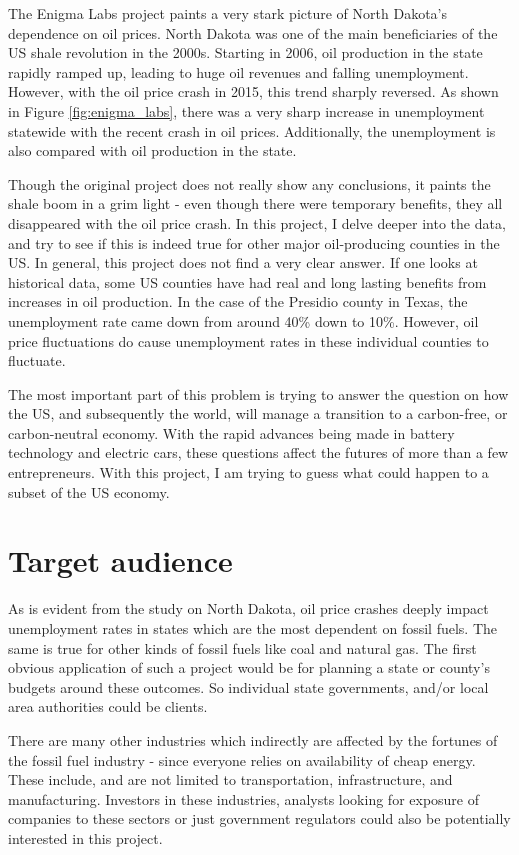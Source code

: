 \documentclass[11pt,letterpaper]{article}
\begin{document}
The Enigma Labs project paints a very stark picture of North Dakota's dependence on oil prices. North Dakota was one of the main beneficiaries of the US shale revolution in the 2000s. Starting in 2006, oil production in the state rapidly ramped up, leading to huge oil revenues and falling unemployment. However, with the oil price crash in 2015, this trend sharply reversed. As shown in Figure \ref{fig:enigma_labs}, there was a very sharp increase in unemployment statewide with the recent crash in oil prices. Additionally, the unemployment is also compared with oil production in the state. 

Though the original project does not really show any conclusions, it paints the shale boom in a grim light - even though there were temporary benefits, they all disappeared with the oil price crash. In this project, I delve deeper into the data, and try to see if this is indeed true for other major oil-producing counties in the US. In general, this project does not find a very clear answer. If one looks at historical data, some US counties have had real and long lasting benefits from increases in oil production. In the case of the Presidio county in Texas, the unemployment rate came down from around 40\% down to 10\%. However, oil price fluctuations do cause unemployment rates in these individual counties to fluctuate.

The most important part of this problem is trying to answer the question on how the US, and subsequently the world, will manage a transition to a carbon-free, or carbon-neutral economy. With the rapid advances being made in battery technology and electric cars, these questions affect the futures of more than a few entrepreneurs. With this project, I am trying to guess what could happen to a subset of the US economy.

\section{Target audience}

As is evident from the study on North Dakota, oil price crashes deeply impact unemployment rates in states which are the most dependent on fossil fuels. The same is true for other kinds of fossil fuels like coal and natural gas. The first obvious application of such a project would be for planning a state or county's budgets around these outcomes. So individual state governments, and/or local area authorities could be clients.

There are many other industries which indirectly are affected by the fortunes of the fossil fuel industry - since everyone relies on availability of cheap energy. These include, and are not limited to transportation, infrastructure, and manufacturing. Investors in these industries, analysts looking for exposure of companies to these sectors or just government regulators could also be potentially interested in this project.
\end{document}
